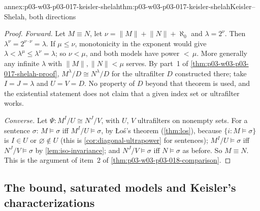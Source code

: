 \begin{annexitem}{annex:p03-w03-p03-017-keisler-shelah}{thm:p03-w03-p03-017-keisler-shelah}{Keisler--Shelah, both directions}
\begin{proof}
\emph{Forward.}  Let \(M\equiv N\), let
\(\nu=\lVert M\rVert+\lVert N\rVert+\aleph_0\) and \(\lambda=2^\nu\).  Then
\(\lambda^\nu=2^{\nu\cdot\nu}=\lambda\).  If \(\mu\le\nu\), monotonicity in
the exponent would give \(\lambda<\lambda^\mu\le\lambda^\nu=\lambda\); so
\(\nu<\mu\), and both models have power \({<}\,\mu\).  More generally any
infinite \(\lambda\) with \(\lVert M\rVert,\lVert N\rVert<\mu\) serves.  By
part~1 of \cref{thm:p03-w03-p03-017-shelah-proof},
\(M^\lambda/D\cong N^\lambda/D\) for the ultrafilter \(D\) constructed there;
take \(I=J=\lambda\) and \(U=V=D\).  No property of \(D\) beyond that theorem
is used, and the existential statement does not claim that a given index set
or ultrafilter works.

\emph{Converse.}  Let \(\Psi:M^I/U\cong N^J/V\), with \(U\), \(V\)
ultrafilters on nonempty sets.  For a sentence \(\sigma\): \(M\models\sigma\)
iff \(M^I/U\models\sigma\), by \L o\'s's theorem (\cref{thm:los}), because
\(\{i:M\models\sigma\}\) is \(I\in U\) or \(\varnothing\notin U\) (this is
\cref{cor:diagonal-ultrapower} for sentences); \(M^I/U\models\sigma\) iff
\(N^J/V\models\sigma\) by \cref{lem:iso-invariance}; and
\(N^J/V\models\sigma\) iff \(N\models\sigma\) as before.  So \(M\equiv N\).
This is the argument of item~2 of \cref{thm:p03-w03-p03-018-comparison}.
\end{proof}
\end{annexitem}

\subsection{The bound, saturated models and Keisler's characterizations}

